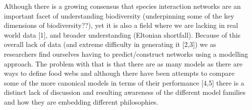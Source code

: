 \documentclass[
]{article}
\begin{document}
Although there is a growing consensus that species interaction networks
are an important facet of understanding biodiversity (underpinning some
of the key dimensions of biodiversity??), yet it is also a field where
we are lacking in real world data {[}1{]}, and broader understanding
(Eltonian shortfall). Because of this overall lack of data (and extreme
difficulty in generating it {[}2,3{]}) we as researchers find ourselves
having to predict/construct networks using a modelling approach. The
problem with that is that there are as many models as there are ways to
define food webs and although there have been attempts to compare some
of the more canonical models in terms of their performance {[}4,5{]}
there is a distinct lack of discussion and resulting awareness of the
different model families and how they are embedding different
philosophies.
\end{document}
